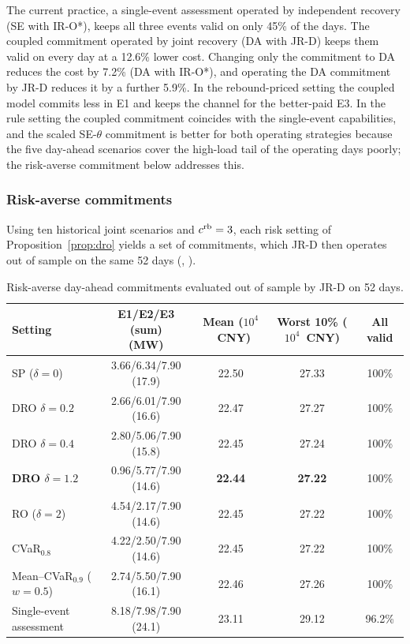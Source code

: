 The current practice, a single-event assessment operated by independent recovery (SE with IR-O*), keeps all three events
valid on only 45\% of the days. The coupled commitment operated by joint recovery (DA with JR-D) keeps them valid on
every day at a 12.6\% lower cost. Changing only the commitment to DA reduces the cost by 7.2\% (DA with IR-O*), and
operating the DA commitment by JR-D reduces it by a further 5.9\%. In the rebound-priced setting the coupled model
commits less in E1 and keeps the channel for the better-paid E3. In the rule setting the coupled commitment coincides
with the single-event capabilities, and the scaled SE-$\theta$ commitment is better for both operating strategies
because the five day-ahead scenarios cover the high-load tail of the operating days poorly; the risk-averse commitment
below addresses this.

\subsubsection{Risk-averse commitments}
\label{sec:res-risk}

Using ten historical joint scenarios and $c^{\mathrm{rb}}=3$, each risk setting of Proposition~\ref{prop:dro} yields a set of
commitments, which JR-D then operates out of sample on the same 52 days (, ).

\begin{table}[!t]
\caption{Risk-averse day-ahead commitments evaluated out of sample by JR-D on 52 days.}
\label{tab:risk}
\centering\footnotesize
\setlength{\tabcolsep}{2.8pt}
\begin{tabular}{@{}lcccc@{}}
\toprule
Setting & \makecell{E1/E2/E3 (sum)\\(MW)} & \makecell{Mean\\($10^4$~CNY)} & \makecell{Worst 10\%\\($10^4$~CNY)} & All valid\\
\midrule
SP ($\delta=0$) & 3.66/6.34/7.90 (17.9) & 22.50 & 27.33 & 100\%\\
DRO $\delta=0.2$ & 2.66/6.01/7.90 (16.6) & 22.47 & 27.27 & 100\%\\
DRO $\delta=0.4$ & 2.80/5.06/7.90 (15.8) & 22.45 & 27.24 & 100\%\\
\textbf{DRO $\delta=1.2$} & 0.96/5.77/7.90 (14.6) & \textbf{22.44} & \textbf{27.22} & 100\%\\
RO ($\delta=2$) & 4.54/2.17/7.90 (14.6) & 22.45 & 27.22 & 100\%\\
CVaR$_{0.8}$ & 4.22/2.50/7.90 (14.6) & 22.45 & 27.22 & 100\%\\
Mean--CVaR$_{0.9}$ ($w=0.5$) & 2.74/5.50/7.90 (16.1) & 22.46 & 27.26 & 100\%\\
Single-event assessment & 8.18/7.98/7.90 (24.1) & 23.11 & 29.12 & 96.2\%\\
\bottomrule
\end{tabular}
\end{table}

